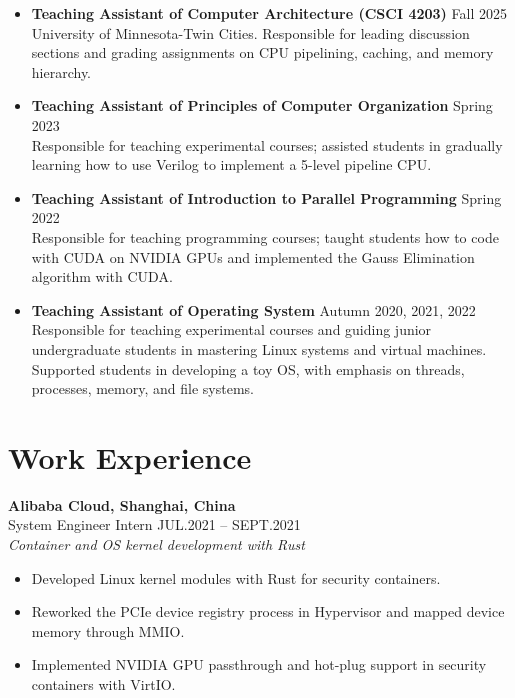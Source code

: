 \documentclass[a4paper,10pt]{article}
\newcommand{\faChevronRight}{\textbullet}
\newcommand{\faBriefcase}{}
\begin{document}
\begin{itemize}[leftmargin=1.2em, label=\textcolor{sectioncolor}{\small\faChevronRight}, itemsep=5pt]

  \item \textbf{Teaching Assistant of Computer Architecture (CSCI 4203)} \hfill Fall 2025\\
  {\small University of Minnesota-Twin Cities. Responsible for leading discussion sections and grading assignments on CPU pipelining, caching, and memory hierarchy.}

  \item \textbf{Teaching Assistant of Principles of Computer Organization} \hfill Spring 2023\\
  {\small Responsible for teaching experimental courses; assisted students in gradually learning how to use Verilog to implement a 5-level pipeline CPU.}

  \item \textbf{Teaching Assistant of Introduction to Parallel Programming} \hfill Spring 2022\\
  {\small Responsible for teaching programming courses; taught students how to code with CUDA on NVIDIA GPUs and implemented the Gauss Elimination algorithm with CUDA.}

  \item \textbf{Teaching Assistant of Operating System} \hfill Autumn 2020, 2021, 2022\\
  {\small Responsible for teaching experimental courses and guiding junior undergraduate students in mastering Linux systems and virtual machines. Supported students in developing a toy OS, with emphasis on threads, processes, memory, and file systems.}

\end{itemize}

\section{\texorpdfstring{\faBriefcase\hspace{6pt}}{}Work Experience}

\textbf{Alibaba Cloud, Shanghai, China}\\
System Engineer Intern \hfill JUL.2021 -- SEPT.2021\\
\textit{Container and OS kernel development with Rust}
\begin{itemize}[nosep, leftmargin=1.2em, label=\textcolor{sectioncolor}{\small\faChevronRight}]
  \item Developed Linux kernel modules with Rust for security containers.
  \item Reworked the PCIe device registry process in Hypervisor and mapped device memory through MMIO.
  \item Implemented NVIDIA GPU passthrough and hot-plug support in security containers with VirtIO.
\end{itemize}
\end{document}
